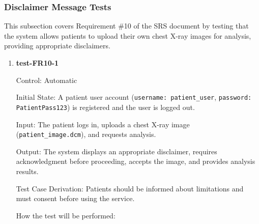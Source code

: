 \documentclass[12pt, titlepage]{article}
\begin{document}
\subsubsection{Disclaimer Message Tests}

This subsection covers Requirement \#10 of the SRS document by testing that the system allows patients to upload their own chest X-ray images for analysis, providing appropriate disclaimers.

\begin{enumerate}

\item \textbf{test-FR10-1} \label{test-FR10-1}

Control: Automatic

Initial State: A patient user account (\texttt{username: patient\_user}, \texttt{password: PatientPass123}) is registered and the user is logged out.

Input: The patient logs in, uploads a chest X-ray image (\texttt{patient\_image.dcm}), and requests analysis.

Output: The system displays an appropriate disclaimer, requires acknowledgment before proceeding, accepts the image, and provides analysis results.

Test Case Derivation: Patients should be informed about limitations and must consent before using the service.

How the test will be performed:


\end{enumerate}
\end{document}
